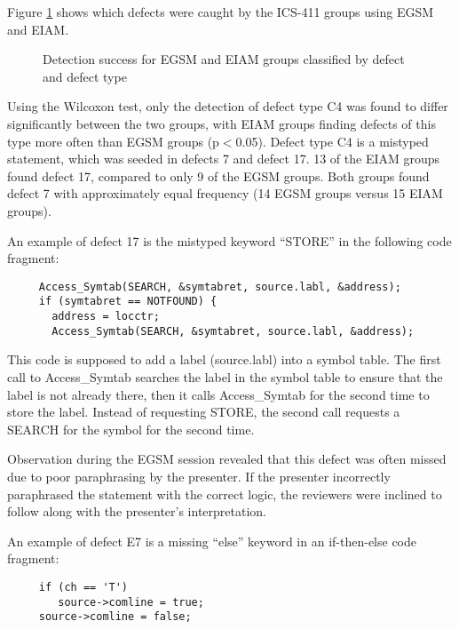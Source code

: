 Figure \ref{fig:class-results} shows which defects were caught by the
ICS-411 groups using EGSM and EIAM. 


\begin{figure}[t]
 {\centerline{}}
 \caption{Detection success for EGSM and EIAM groups classified by defect 
          and defect type}
 \label{fig:class-results}
\end{figure}


Using the Wilcoxon test, only the detection of defect type C4 was found to
differ significantly between the two groups, with EIAM groups finding
defects of this type more often than EGSM groups (p$<$0.05).
Defect type C4 is a mistyped statement, which was seeded in defects 7 and
defect 17.  13 of the EIAM groups found defect 17, compared to only 9 of
the EGSM groups. Both groups found defect 7 with approximately equal
frequency (14 EGSM groups versus 15 EIAM groups).

An example of defect 17 is the mistyped keyword ``STORE'' in the
following code fragment:

\small
{}
\begin{verbatim}
     Access_Symtab(SEARCH, &symtabret, source.labl, &address);
     if (symtabret == NOTFOUND) {
       address = locctr;
       Access_Symtab(SEARCH, &symtabret, source.labl, &address);
\end{verbatim}
\normalsize

This code is supposed to add a label (source.labl) into a symbol table.
The first call to Access\_Symtab searches the label in the symbol table
to ensure that the label is not already there, then it calls
Access\_Symtab for the second time to store the label.  Instead of
requesting STORE, the second call requests a SEARCH for the symbol
for the second time.

Observation during the EGSM session revealed that this defect was often
missed due to poor paraphrasing by the presenter. If the presenter
incorrectly paraphrased the statement with the correct logic, the reviewers
were inclined to follow along with the presenter's interpretation.
                               
An example of defect E7 is a missing ``else'' keyword in an 
if-then-else code fragment:

\small
{}
\begin{verbatim}
     if (ch == 'T')
        source->comline = true;
     source->comline = false; 
\end{verbatim}
\normalsize

